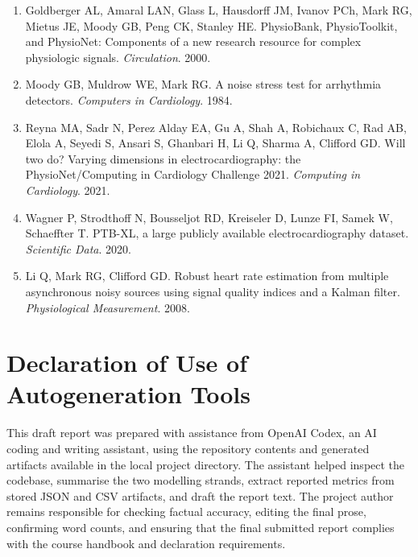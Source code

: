 \documentclass[11pt,a4paper]{article}
\begin{document}
\begin{enumerate}
  \item Goldberger AL, Amaral LAN, Glass L, Hausdorff JM, Ivanov PCh, Mark RG, Mietus JE, Moody GB, Peng CK, Stanley HE. PhysioBank, PhysioToolkit, and PhysioNet: Components of a new research resource for complex physiologic signals. \textit{Circulation}. 2000.
  \item Moody GB, Muldrow WE, Mark RG. A noise stress test for arrhythmia detectors. \textit{Computers in Cardiology}. 1984.
  \item Reyna MA, Sadr N, Perez Alday EA, Gu A, Shah A, Robichaux C, Rad AB, Elola A, Seyedi S, Ansari S, Ghanbari H, Li Q, Sharma A, Clifford GD. Will two do? Varying dimensions in electrocardiography: the PhysioNet/Computing in Cardiology Challenge 2021. \textit{Computing in Cardiology}. 2021.
  \item Wagner P, Strodthoff N, Bousseljot RD, Kreiseler D, Lunze FI, Samek W, Schaeffter T. PTB-XL, a large publicly available electrocardiography dataset. \textit{Scientific Data}. 2020.
  \item Li Q, Mark RG, Clifford GD. Robust heart rate estimation from multiple asynchronous noisy sources using signal quality indices and a Kalman filter. \textit{Physiological Measurement}. 2008.
\end{enumerate}

\section*{Declaration of Use of Autogeneration Tools}

This draft report was prepared with assistance from OpenAI Codex, an AI coding and writing assistant, using the repository contents and generated artifacts available in the local project directory. The assistant helped inspect the codebase, summarise the two modelling strands, extract reported metrics from stored JSON and CSV artifacts, and draft the report text. The project author remains responsible for checking factual accuracy, editing the final prose, confirming word counts, and ensuring that the final submitted report complies with the course handbook and declaration requirements.
\end{document}
